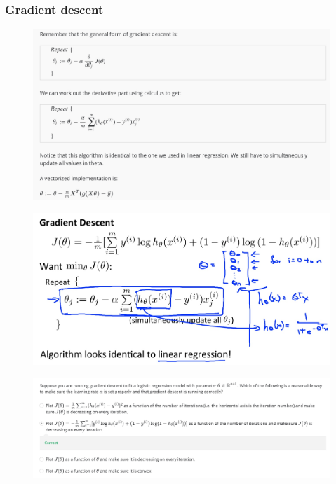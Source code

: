 \documentclass[12pt, A4,onecolumn]{article} %
\begin{document}
\subsubsection{Gradient descent}
\begin{figure}[H]
	\centering
	\includegraphics[width=1\textwidth]{./Imagenes/gradDes1}
\end{figure}

\begin{figure}[H]
	\centering
	\includegraphics[width=1\textwidth]{./Imagenes/gradDes2}
\end{figure}

\begin{figure}[H]
	\centering
	\includegraphics[width=1\textwidth]{./Imagenes/testCostFuncSimple1}
\end{figure}
\end{document}

